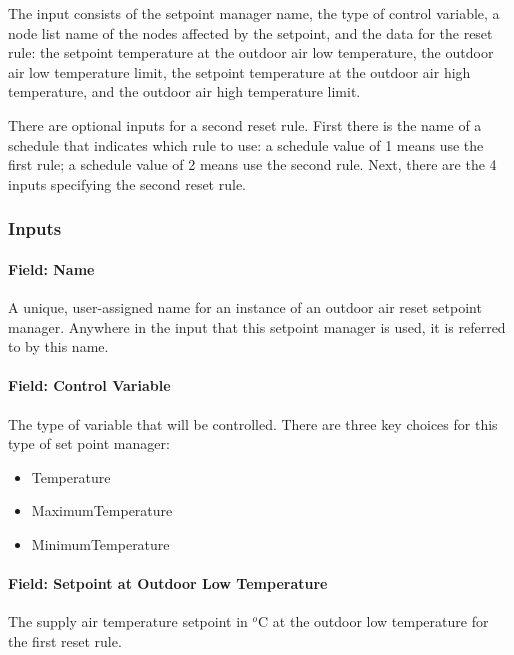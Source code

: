 The input consists of the setpoint manager name, the type of control variable, a node list name of the nodes affected by the setpoint, and the data for the reset rule: the setpoint temperature at the outdoor air low temperature, the outdoor air low temperature limit, the setpoint temperature at the outdoor air high temperature, and the outdoor air high temperature limit.

There are optional inputs for a second reset rule. First there is the name of a schedule that indicates which rule to use: a schedule value of 1 means use the first rule; a schedule value of 2 means use the second rule. Next, there are the 4 inputs specifying the second reset rule.

\subsubsection{Inputs}\label{inputs-2-037}

\paragraph{Field: Name}\label{field-name-2-035}

A unique, user-assigned name for an instance of an outdoor air reset setpoint manager. Anywhere in the input that this setpoint manager is used, it is referred to by this name.

\paragraph{Field: Control Variable}\label{field-control-variable-2}

The type of variable that will be controlled. There are three key choices for this type of set point manager:

\begin{itemize}
\item
  Temperature
\item
  MaximumTemperature
\item
  MinimumTemperature
\end{itemize}

\paragraph{Field: Setpoint at Outdoor Low Temperature}\label{field-setpoint-at-outdoor-low-temperature}

The supply air temperature setpoint in \(^{o}\)C at the outdoor low temperature for the first reset rule.

